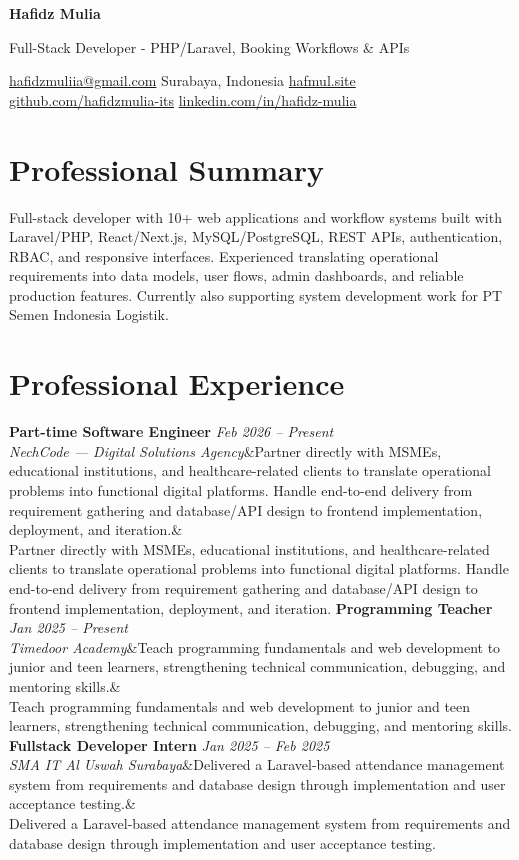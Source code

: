 \documentclass[a4paper,10.5pt]{article}
\newcommand{\cvname}[1]{{\centering\LARGE\bfseries #1\par\vspace{1pt}}}
\newcommand{\cvtitle}[1]{{\centering\normalsize\color{accent} #1\par\vspace{2pt}}}
\newcommand{\cvcontact}[1]{{\centering\small #1\par\vspace{4pt}}}
\newcommand{\cventry}[4]{\noindent\textbf{#1} \hfill \textit{#3} \\\textit{#2}\ifx&#4& \else \\ {\small #4} \fi\vspace{4pt}}
\begin{document}
\cvname{Hafidz Mulia}
\cvtitle{Full-Stack Developer - PHP/Laravel, Booking Workflows \& APIs}
\cvcontact{\href{mailto:hafidzmuliia@gmail.com}{hafidzmuliia@gmail.com} \quad\textbar\quad Surabaya, Indonesia \quad\textbar\quad \href{https://hafmul.site}{hafmul.site} \\
\href{https://github.com/hafidzmulia-its}{github.com/hafidzmulia-its} \quad\textbar\quad \href{https://www.linkedin.com/in/hafidz-mulia/}{linkedin.com/in/hafidz-mulia}}

\section{Professional Summary}
Full-stack developer with 10+ web applications and workflow systems built with Laravel/PHP, React/Next.js, MySQL/PostgreSQL, REST APIs, authentication, RBAC, and responsive interfaces. Experienced translating operational requirements into data models, user flows, admin dashboards, and reliable production features. Currently also supporting system development work for PT Semen Indonesia Logistik.

\section{Professional Experience}
\cventry
  {Part-time Software Engineer}
  {NechCode --- Digital Solutions Agency}
  {Feb 2026 -- Present}
  {Partner directly with MSMEs, educational institutions, and healthcare-related clients to translate operational problems into functional digital platforms. Handle end-to-end delivery from requirement gathering and database/API design to frontend implementation, deployment, and iteration.}
\cventry
  {Programming Teacher}
  {Timedoor Academy}
  {Jan 2025 -- Present}
  {Teach programming fundamentals and web development to junior and teen learners, strengthening technical communication, debugging, and mentoring skills.}
\cventry
  {Fullstack Developer Intern}
  {SMA IT Al Uswah Surabaya}
  {Jan 2025 -- Feb 2025}
  {Delivered a Laravel-based attendance management system from requirements and database design through implementation and user acceptance testing.}
\end{document}
